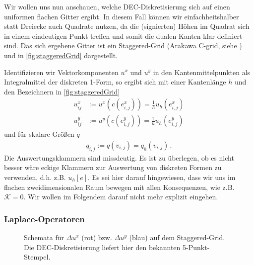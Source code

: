 \documentclass[a4paper,11pt]{scrartcl}
\newcommand{\U}{u} %
\newcommand{\gauss}{\mathcal{K}} %
\newcommand{\formPeriod}{\,\text{.}}
\newcommand{\ingo}[1]{{\color{blue}#1}}
\begin{document}
Wir wollen uns nun anschauen, welche DEC-Diskretisierung sich auf einen uniformen flachen Gitter ergibt.
In diesem Fall können wir einfachheitshalber statt Dreiecke auch Quadrate nutzen,
da die (signierten) Höhen im Quadrat sich in einem eindeutigen Punkt treffen und somit die dualen Kanten klar definiert sind.
Das sich ergebene Gitter ist ein Staggered-Grid (Arakawa C-grid, siehe \cite{Arakawa1977}) und in \autoref{fig:staggeredGrid}
dargestellt. 

Identifizieren wir Vektorkomponenten \( u^{x} \) und \( u^{y} \) in den Kantenmittelpunkten als Integralmittel der diskreten 1-Form,
so ergibt sich mit einer Kantenlänge \( h \) und den Bezeichnern in \autoref{fig:staggeredGrid}
\begin{align}
  u^{x}_{ij} &:= u^{x}(c(e^{x}_{i,j}))
                = \frac{1}{h} \U_{h}(e^{x}_{i,j}) \\
  u^{y}_{ij} &:= u^{y}(c(e^{y}_{i,j}))
                = \frac{1}{h} \U_{h}(e^{y}_{i,j}) 
\end{align}
und für skalare Größen \( q \)
\begin{align}
  q_{i,j} := q(v_{i,j}) = q_{h}(v_{i,j}) \formPeriod
\end{align}
\ingo{Die Auswertungsklammern sind missdeutig. Es ist zu überlegen, ob es nicht besser wäre eckige Klammern zur Auswertung von diskreten Formen zu verwenden, d.h. z.B. \( \U_{h}[e] \).}
Es sei hier darauf hingewiesen, dass wir uns im flachen zweidimensionalen Raum bewegen mit allen Konsequenzen, wie z.B. \( \gauss = 0 \).
Wir wollen im Folgendem darauf nicht mehr explizit eingehen.

  \subsubsection{Laplace-Operatoren}
    \begin{figure}[tbp]
      \centering
      
      \caption{Schemata für \( \Delta u^{x} \) (rot) bzw. \( \Delta u^{y} \) (blau) auf dem Staggered-Grid.
                Die DEC-Diskretisierung liefert hier den bekannten 5-Punkt-Stempel.}
      \label{fig:deRhamStaggeredGrid}
    \end{figure}
\end{document}
